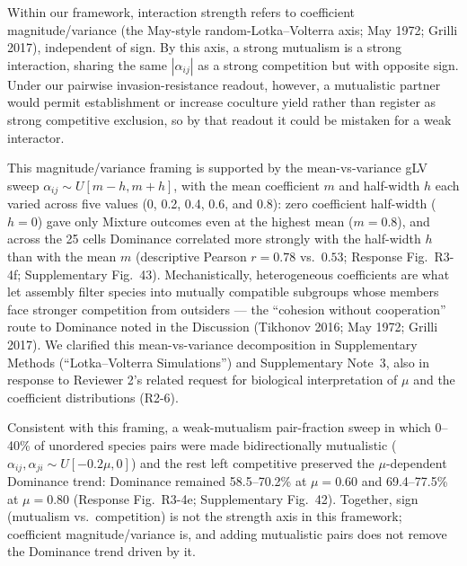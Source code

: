 
\responselabel
Within our framework, interaction strength refers to coefficient magnitude/variance (the May-style random-Lotka--Volterra axis; May 1972; Grilli 2017), independent of sign. By this axis, a strong mutualism is a strong interaction, sharing the same $|\alpha_{ij}|$ as a strong competition but with opposite sign. Under our pairwise invasion-resistance readout, however, a mutualistic partner would permit establishment or increase coculture yield rather than register as strong competitive exclusion, so by that readout it could be mistaken for a weak interactor.

This magnitude/variance framing is supported by the mean-vs-variance gLV sweep $\alpha_{ij}\sim U[m-h,m+h]$, with the mean coefficient $m$ and half-width $h$ each varied across five values (0, 0.2, 0.4, 0.6, and 0.8): zero coefficient half-width ($h=0$) gave only Mixture outcomes even at the highest mean ($m=0.8$), and across the 25 cells Dominance correlated more strongly with the half-width $h$ than with the mean $m$ (descriptive Pearson $r=0.78$ vs.\ $0.53$; Response Fig.~R3-4f; Supplementary Fig.~43). Mechanistically, heterogeneous coefficients are what let assembly filter species into mutually compatible subgroups whose members face stronger competition from outsiders --- the ``cohesion without cooperation'' route to Dominance noted in the Discussion (Tikhonov 2016; May 1972; Grilli 2017). We clarified this mean-vs-variance decomposition in Supplementary Methods (``Lotka--Volterra Simulations'') and Supplementary Note~3, also in response to Reviewer 2's related request for biological interpretation of $\mu$ and the coefficient distributions (R2-6).

Consistent with this framing, a weak-mutualism pair-fraction sweep in which 0--40\% of unordered species pairs were made bidirectionally mutualistic ($\alpha_{ij},\alpha_{ji}\sim U[-0.2\mu,0]$) and the rest left competitive preserved the $\mu$-dependent Dominance trend: Dominance remained 58.5--70.2\% at $\mu=0.60$ and 69.4--77.5\% at $\mu=0.80$ (Response Fig.~R3-4e; Supplementary Fig.~42). Together, sign (mutualism vs.\ competition) is not the strength axis in this framework; coefficient magnitude/variance is, and adding mutualistic pairs does not remove the Dominance trend driven by it.

